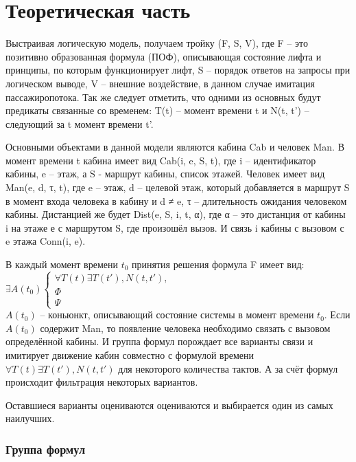 \section{ Теоретическая часть}
	Выстраивая логическую модель, получаем тройку (F, S, V), где F -- это позитивно образованная формула (ПОФ),
		описывающая состояние лифта и принципы, по которым функционирует лифт,
		S -- порядок ответов на запросы при логическом выводе, V -- внешние воздействие,
		в данном случае имитация пассажиропотока. Так же следует отметить, что одними из основных будут
		предикаты связанные со временем: T(t) -- момент времени t и N(t, t') -- следующий за t момент времени t'.

	Основными объектами в данной модели являются кабина Cab и человек Man.
		В момент времени t кабина имеет вид Cab(i, e, S, t), где i – идентификатор кабины, e – этаж,
		а S - маршрут кабины, список этажей. Человек имеет вид Man(e, d, τ, t), где e – этаж,
		d – целевой этаж, который добавляется в маршрут S в момент входа человека в кабину и d ≠ e,
		τ – длительность ожидания человеком кабины.
		Дистанцией же будет Dist(e, S, i, t, α), где α – это дистанция от кабины i
		на этаже е с маршрутом S, где произошёл вызов. И связь i кабины с вызовом с e этажа Conn(i, e).

	В каждый момент времени $t_0$ принятия решения формула F имеет вид:\\

	$ \exists A(t_0) \begin{cases} \forall T(t)\exists T(t'), N(t, t'), \\ \Phi \\ \Psi \end{cases} $\\

	$A(t_0)$ -- коньюнкт, описывающий состояние системы в момент времени $t_0$. Если $A(t_0)$ содержит Man,
		то появление человека необходимо связать с вызовом определённой кабины.
		И группа формул \Phi порождает все варианты связи и имитирует движение кабин совместно с
		формулой времени $\forall T(t)\exists T(t'), N(t, t')$ для некоторого количества тактов.
		А за счёт формул \Psi происходит фильтрация некоторых вариантов.

	Оставшиеся варианты оцениваются оцениваются и выбирается один из самых наилучших.

	\subsubsection{Группа формул \Psi}

